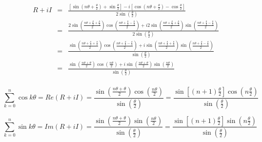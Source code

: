 \documentclass[letterpaper,12pt,fleqn]{article}
\renewcommand{\o}{\theta}
\begin{document}
\begin{theproof}
\begin{eqnarray*}
R+iI &=& \frac{\left[\sin\left(n\o+\frac{\o}{2}\right)+\sin\frac{\o}{2}\right]-
            i\left[\cos\left(n\o+\frac{\o}{2}\right)-\cos\frac{\o}{2}\right]}
            {2\sin\left(\frac{\o}{2}\right)} \\
     &=& \frac{2\sin\left(\frac{n\o+\frac{\o}{2}+\frac{\o}{2}}{2}\right)
            \cos\left(\frac{n\o+\frac{\o}{2}-\frac{\o}{2}}{2}\right)+
            i2\sin\left(\frac{n\o+\frac{\o}{2}+\frac{\o}{2}}{2}\right)
            \sin\left(\frac{n\o+\frac{\o}{2}-\frac{\o}{2}}{2}\right)}
            {2\sin\left(\frac{\o}{2}\right)} \\
     &=& \frac{\sin\left(\frac{n\o+\frac{\o}{2}+\frac{\o}{2}}{2}\right)
            \cos\left(\frac{n\o+\frac{\o}{2}-\frac{\o}{2}}{2}\right)+
            i\sin\left(\frac{n\o+\frac{\o}{2}+\frac{\o}{2}}{2}\right)
            \sin\left(\frac{n\o+\frac{\o}{2}-\frac{\o}{2}}{2}\right)}
            {\sin\left(\frac{\o}{2}\right)} \\
     &=& \frac{\sin\left(\frac{n\o+\o}{2}\right)
            \cos\left(\frac{n\o}{2}\right)+
            i\sin\left(\frac{n\o+\o}{2}\right)
            \sin\left(\frac{n\o}{2}\right)}
            {\sin\left(\frac{\o}{2}\right)} \\
\end{eqnarray*}

\[\sum_{k=0}^n\cos k\o=Re(R+iI)=
    \frac{\sin\left(\frac{n\o+\o}{2}\right)\cos\left(\frac{n\o}{2}\right)}
    {\sin\left(\frac{\o}{2}\right)}=
    \frac{\sin\left[(n+1)\frac{\o}{2}\right]\cos\left(n\frac{\o}{2}\right)}
    {\sin\left(\frac{\o}{2}\right)}\]

\[\sum_{k=0}^n\sin k\o=Im(R+iI)=
    \frac{\sin\left(\frac{n\o+\o}{2}\right)\sin\left(\frac{n\o}{2}\right)}
    {\sin\left(\frac{\o}{2}\right)}=
    \frac{\sin\left[(n+1)\frac{\o}{2}\right]\sin\left(n\frac{\o}{2}\right)}
    {\sin\left(\frac{\o}{2}\right)}\]
\end{theproof}
\end{document}
